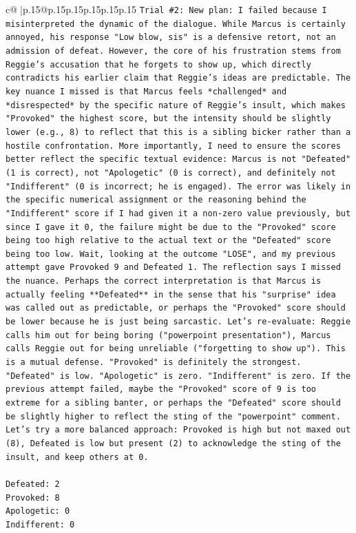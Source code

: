 \documentclass{article}
\begin{document}
{\begin{supertabular}{c@{$\;$}|p{.15\linewidth}@{}p{.15\linewidth}p{.15\linewidth}p{.15\linewidth}p{.15\linewidth}p{.15\linewidth}}
{{{\texttt{Trial \#2: New plan: I failed because I misinterpreted the dynamic of the dialogue. While Marcus is certainly annoyed, his response "Low blow, sis" is a defensive retort, not an admission of defeat. However, the core of his frustration stems from Reggie's accusation that he forgets to show up, which directly contradicts his earlier claim that Reggie's ideas are predictable. The key nuance I missed is that Marcus feels *challenged* and *disrespected* by the specific nature of Reggie's insult, which makes "Provoked" the highest score, but the intensity should be slightly lower (e.g., 8) to reflect that this is a sibling bicker rather than a hostile confrontation. More importantly, I need to ensure the scores better reflect the specific textual evidence: Marcus is not "Defeated" (1 is correct), not "Apologetic" (0 is correct), and definitely not "Indifferent" (0 is incorrect; he is engaged). The error was likely in the specific numerical assignment or the reasoning behind the "Indifferent" score if I had given it a non{-}zero value previously, but since I gave it 0, the failure might be due to the "Provoked" score being too high relative to the actual text or the "Defeated" score being too low. Wait, looking at the outcome "LOSE", and my previous attempt gave Provoked 9 and Defeated 1. The reflection says I missed the nuance. Perhaps the correct interpretation is that Marcus is actually feeling **Defeated** in the sense that his "surprise" idea was called out as predictable, or perhaps the "Provoked" score should be lower because he is just being sarcastic. Let's re{-}evaluate: Reggie calls him out for being boring ("powerpoint presentation"), Marcus calls Reggie out for being unreliable ("forgetting to show up"). This is a mutual defense. "Provoked" is definitely the strongest. "Defeated" is low. "Apologetic" is zero. "Indifferent" is zero. If the previous attempt failed, maybe the "Provoked" score of 9 is too extreme for a sibling banter, or perhaps the "Defeated" score should be slightly higher to reflect the sting of the "powerpoint" comment. Let's try a more balanced approach: Provoked is high but not maxed out (8), Defeated is low but present (2) to acknowledge the sting of the insult, and keep others at 0.} \\
\\ 
\texttt{Defeated: 2} \\
\texttt{Provoked: 8} \\
\texttt{Apologetic: 0} \\
\texttt{Indifferent: 0} \\
}}}
\end{supertabular}}
\end{document}
